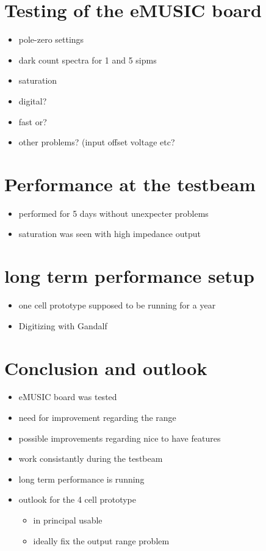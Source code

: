 \chapter{Testing of the eMUSIC board}
\begin{itemize}
	\item pole-zero settings
	\item dark count spectra for 1 and 5 sipms
	\item saturation
	\item digital?
	\item fast or?
	\item other problems? (input offset voltage etc?
\end{itemize}

\chapter{Performance at the testbeam}
\begin{itemize}
	\item performed for 5 days without unexpecter problems
	\item saturation was seen with high impedance output
\end{itemize}

\chapter{long term performance setup}
\begin{itemize}
	\item one cell prototype supposed to be running for a year
	\item Digitizing with Gandalf
\end{itemize}

\chapter{Conclusion and outlook}
\begin{itemize}
	\item eMUSIC board was tested
	\item need for improvement regarding the range
	\item possible improvements regarding nice to have features
	\item work consistantly during the testbeam
	\item long term performance is running
	\item outlook for the 4 cell prototype 
	\begin{itemize}
		\item in principal usable 
		\item ideally fix the output range problem
	\end{itemize}
\end{itemize}
